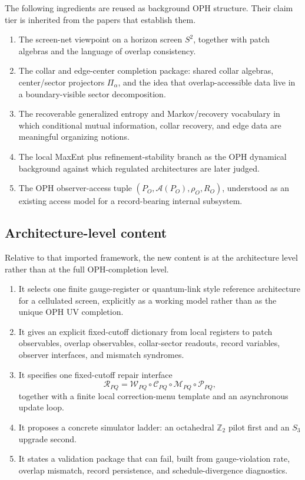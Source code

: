 \documentclass[11pt]{article}
\begin{document}
The following ingredients are reused as background OPH structure. Their claim tier is inherited from the papers that establish them.
\begin{enumerate}[leftmargin=2em]
\item The screen-net viewpoint on a horizon screen $S^2$, together with patch algebras and the
language of overlap consistency.
\item The collar and edge-center completion package: shared collar algebras, center/sector
projectors $\Pi_{\alpha}$, and the idea that overlap-accessible data live in a boundary-visible
sector decomposition.
\item The recoverable generalized entropy and Markov/recovery vocabulary in which conditional
mutual information, collar recovery, and edge data are meaningful organizing notions.
\item The local MaxEnt plus refinement-stability branch as the OPH dynamical background
against which regulated architectures are later judged.
\item The OPH observer-access tuple $(P_O,\mathcal A(P_O),\rho_O,R_O)$, understood as an
existing access model for a record-bearing internal subsystem.
\end{enumerate}

\subsection{Architecture-level content}

Relative to that imported framework, the new content is at the architecture level rather than at the full OPH-completion level.
\begin{enumerate}[leftmargin=2em]
\item It selects one finite gauge-register or quantum-link style reference architecture for a
cellulated screen, explicitly as a working model rather than as the unique OPH UV completion.
\item It gives an explicit fixed-cutoff dictionary from local registers to patch observables,
overlap observables, collar-sector readouts, record variables, observer interfaces, and mismatch
syndromes.
\item It specifies one fixed-cutoff repair interface
\begin{equation}
\mathcal R_{PQ}=\mathcal W_{PQ}\circ \mathcal C_{PQ}\circ \mathcal M_{PQ}\circ \mathcal P_{PQ},
\end{equation}
together with a finite local correction-menu template and an asynchronous update loop.
\item It proposes a concrete simulator ladder: an octahedral $\mathbb Z_2$ pilot first and an
$S_3$ upgrade second.
\item It states a validation package that can fail, built from gauge-violation rate, overlap
mismatch, record persistence, and schedule-divergence diagnostics.
\end{enumerate}
\end{document}

